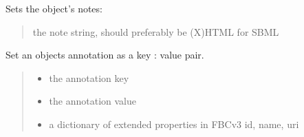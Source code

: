 \documentclass[letterpaper,12pt,english]{sphinxmanual}
\begin{document}
\begin{fulllineitems}
\begin{fulllineitems}
\begin{quote}
\begin{description}
\end{description}\end{quote}

\end{fulllineitems}


\begin{fulllineitems}
\label{\detokenize{api/core:cbmpy.CBModel.Fbase.setNotes}}
\pysigstartsignatures
\pysiglinewithargsret
{}
{}
{}
\pysigstopsignatures
\sphinxAtStartPar
Sets the object’s notes:
\begin{quote}\begin{description}
\sphinxAtStartPar
{} \textendash{} the note string, should preferably be (X)HTML for SBML

\end{description}\end{quote}

\end{fulllineitems}


\begin{fulllineitems}
\label{\detokenize{api/core:cbmpy.CBModel.Fbase.setAnnotation}}
\pysigstartsignatures
\pysiglinewithargsret
{}
{\sphinxparamcomma {}\sphinxparamcomma {}}
{}
\pysigstopsignatures
\sphinxAtStartPar
Set an objects annotation as a key : value pair.
\begin{quote}\begin{description}
\begin{itemize}
\item {} 
\sphinxAtStartPar
{} \textendash{} the annotation key

\item {} 
\sphinxAtStartPar
{} \textendash{} the annotation value

\item {} 
\sphinxAtStartPar
{} \textendash{} a dictionary of extended properties in FBCv3 id, name, uri


\end{itemize}
\end{description}
\end{quote}
\end{fulllineitems}
\end{fulllineitems}
\end{document}
